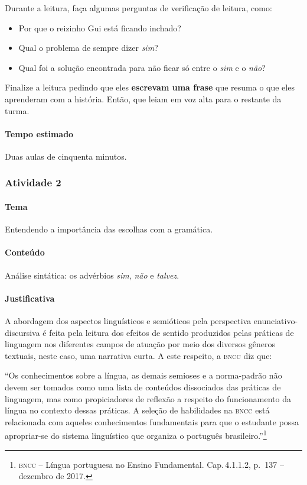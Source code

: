 \documentclass[11pt]{extarticle}
\begin{document}
Durante a leitura, faça algumas perguntas de verificação de leitura, como:

\begin{itemize}
\item Por que o reizinho Gui está ficando inchado?
\item Qual o problema de sempre dizer \textit{sim}?
\item Qual foi a solução encontrada para não ficar só entre o \textit{sim} e o \textit{não}?
\end{itemize}

Finalize a leitura pedindo que eles \textbf{escrevam uma frase} que resuma o que 
eles aprenderam com a história. Então, que leiam em voz alta para o restante da turma. 

\paragraph{Tempo estimado} Duas aulas de cinquenta minutos.

\subsubsection{Atividade 2}


\paragraph{Tema} Entendendo a importância das escolhas com a gramática.

\paragraph{Conteúdo} Análise sintática: os advérbios \textit{sim}, \textit{não} e \textit{talvez}.

\paragraph{Justificativa} A abordagem dos aspectos linguísticos e semióticos 
pela perspectiva enunciativo-discursiva é feita pela leitura dos efeitos de 
sentido produzidos pelas práticas de linguagem nos diferentes campos de atuação 
por meio dos diversos gêneros textuais, neste caso, uma narrativa curta.
A este respeito, a \textsc{bncc} diz que:

``Os conhecimentos sobre a língua, as demais semioses e a norma-padrão não devem ser tomados como uma lista de conteúdos dissociados das práticas de linguagem, mas como propiciadores de reflexão a respeito do funcionamento da língua no contexto dessas práticas. A seleção de habilidades na \textsc{bncc} está relacionada com aqueles conhecimentos fundamentais para que o estudante possa apropriar-se do sistema linguístico que organiza o português brasileiro.''\footnote{\textsc{bncc} -- Língua portuguesa no Ensino Fundamental. Cap.\,4.1.1.2, p.\, 137 -- dezembro de 2017.} 
\end{document}
